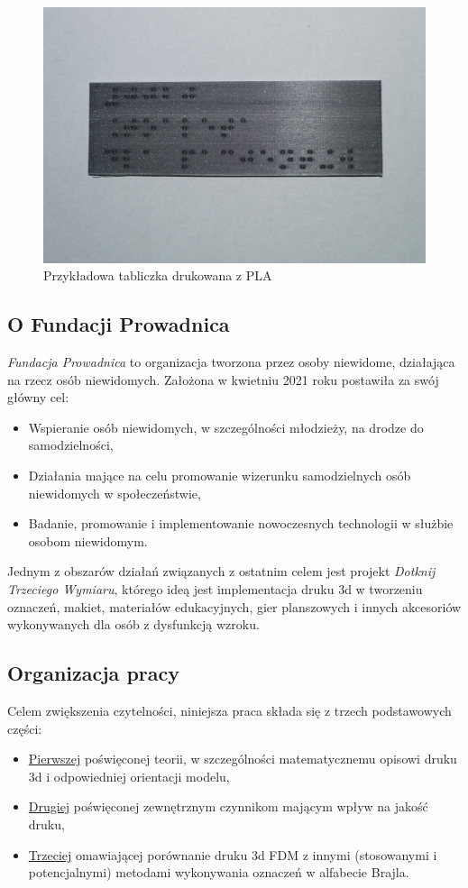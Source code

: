 \documentclass[12pt,a4paper]{article}
\begin{document}
\begin{figure}
\includegraphics[width=\linewidth]{sgn_pla.jpg}
\caption{Przykładowa tabliczka drukowana z PLA}
\end{figure}

\subsection{O Fundacji Prowadnica}
\emph{Fundacja Prowadnica} to organizacja tworzona przez osoby niewidome, działająca na rzecz osób niewidomych. Założona w kwietniu 2021 roku postawiła za swój główny cel:
\begin{itemize}
\item Wspieranie osób niewidomych, w szczególności młodzieży, na drodze do samodzielności,
\item Działania mające na celu promowanie wizerunku samodzielnych osób niewidomych w społeczeństwie,
\item Badanie, promowanie i implementowanie nowoczesnych technologii w służbie osobom niewidomym.
\end{itemize}

Jednym z obszarów działań związanych z ostatnim celem jest projekt \emph{Dotknij Trzeciego Wymiaru}, którego ideą jest implementacja druku 3d w tworzeniu oznaczeń, makiet, materiałów edukacyjnych, gier planszowych i innych akcesoriów wykonywanych dla osób z dysfunkcją wzroku.

\subsection{Organizacja pracy}
Celem zwiększenia czytelności, niniejsza praca składa się z trzech podstawowych części:
\begin{itemize}
\item \hyperref[sec:geometry]{Pierwszej} poświęconej teorii, w szczególności matematycznemu opisowi druku 3d i odpowiedniej orientacji modelu,
\item \hyperref[sec:factors]{Drugiej} poświęconej zewnętrznym czynnikom mającym wpływ na jakość druku,
\item \hyperref[sec:comparison]{Trzeciej} omawiającej porównanie druku 3d FDM z innymi (stosowanymi i potencjalnymi) metodami wykonywania oznaczeń w alfabecie Brajla.
\end{itemize}
\end{document}

